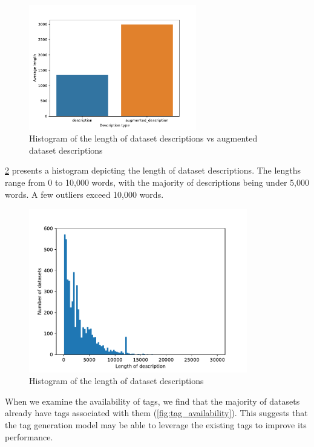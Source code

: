 \begin{figure}[h]
    \centering
    \includegraphics[width=0.65\textwidth]{figures/description_vs_augmented_description.pdf}
    \caption{Histogram of the length of dataset descriptions vs augmented dataset descriptions}
    \label{fig:description_vs_augmented_description}
\end{figure}

\cref{fig:length_of_descriptions} presents a histogram depicting the length of dataset descriptions. The lengths range from 0 to 10,000 words, with the majority of descriptions being under 5,000 words. A few outliers exceed 10,000 words.

\begin{figure}[h]
    \centering
    \includegraphics[width=0.85\textwidth]{figures/length_of_descriptions.pdf}
    \caption{Histogram of the length of dataset descriptions}
    \label{fig:length_of_descriptions}
\end{figure}

When we examine the availability of tags, we find that the majority of datasets already have tags associated with them (\cref{fig:tag_availability}). This suggests that the tag generation model may be able to leverage the existing tags to improve its performance.

